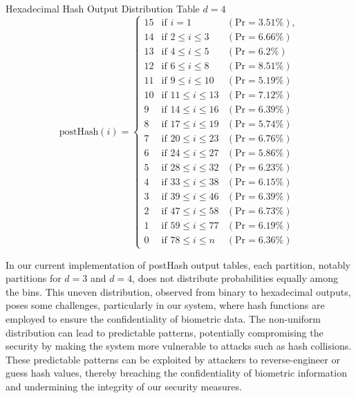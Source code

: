 Hexadecimal Hash Output Distribution Table \(d=4\)
{
\renewcommand{\arraystretch}{1.25}
\[
\text{postHash}(i) = \left\{
\begin{array}{lll}
    \text{15} & \text{if } i = 1 & (\text{Pr} = 3.51\%), \\
    \text{14} & \text{if } 2 \leq i \leq 3 & (\text{Pr} = 6.66\%) \\
    \text{13} & \text{if } 4 \leq i \leq 5 & (\text{Pr} = 6.2\%) \\
    \text{12} & \text{if } 6 \leq i \leq 8 & (\text{Pr} = 8.51\%) 
    \\
    \text{11} & \text{if } 9 \leq i \leq 10 & (\text{Pr} = 5.19\%) \\
    \text{10} & \text{if } 11 \leq i \leq 13 & (\text{Pr} = 7.12\%) \\
    \text{9} & \text{if } 14 \leq i \leq 16 & (\text{Pr} = 6.39\%) \\
    \text{8} & \text{if } 17 \leq i \leq 19 & (\text{Pr} = 5.74\%) \\
    \text{7} & \text{if } 20 \leq i \leq 23 & (\text{Pr} = 6.76\%) \\
    \text{6} & \text{if } 24 \leq i \leq 27 & (\text{Pr} = 5.86\%) \\
    \text{5} & \text{if } 28 \leq i \leq 32 & (\text{Pr} = 6.23\%) \\
    \text{4} & \text{if } 33 \leq i \leq 38 & (\text{Pr} = 6.15\%) \\
    \text{3} & \text{if } 39 \leq i \leq 46 & (\text{Pr} = 6.39\%) \\
    \text{2} & \text{if } 47 \leq i \leq 58 & (\text{Pr} = 6.73\%) \\
    \text{1} & \text{if } 59 \leq i \leq 77 & (\text{Pr} = 6.19\%) \\
    \text{0} & \text{if } 78 \leq i \leq n & (\text{Pr} = 6.36\%)
\end{array}
\right.
\]
}

In our current implementation of postHash output tables, each partition, notably partitions for \(d = 3\) and \(d = 4\), does not distribute probabilities equally among the bins. This uneven distribution, observed from binary to hexadecimal outputs, poses some challenges, particularly in our system, where hash functions are employed to ensure the confidentiality of biometric data. The non-uniform distribution can lead to predictable patterns, potentially compromising the security by making the system more vulnerable to attacks such as hash collisions. These predictable patterns can be exploited by attackers to reverse-engineer or guess hash values, thereby breaching the confidentiality of biometric information and undermining the integrity of our security measures.

